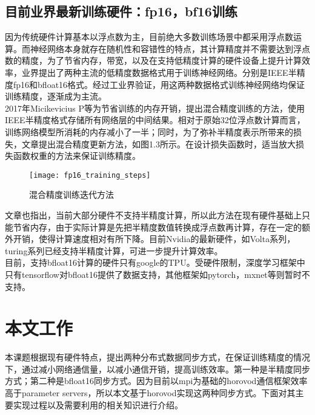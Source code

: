 \subsection{目前业界最新训练硬件：fp16，bf16训练}
因为传统硬件计算基本以浮点数为主，目前绝大多数训练场景中都采用浮点数运算。而神经网络本身就存在随机性和容错性的特点，其计算精度并不需要达到浮点数的精度，为了节省内存，带宽，以及在支持低精度计算的硬件设备上提升计算效率，业界提出了两种主流的低精度数据格式用于训练神经网络。分别是IEEE半精度fp16和bfloat16格式。经过工业界验证，用这两种数据格式训练神经网络均保证训练精度，逐渐成为主流。\\
2017年Micikevicius P等为节省训练的内存开销，提出混合精度训练的方法，使用IEEE半精度格式存储所有网络层的中间结果。相对于原始32位浮点数计算而言，训练网络模型所消耗的内存减小了一半；同时，为了弥补半精度表示所带来的损失，文章提出混合精度更新方法，如图1.3所示。在设计损失函数时，适当放大损失函数权重的方法来保证训练精度。\\
\begin{figure}[htp]
\centering
\texttt{[image: fp16\_training\_steps]}
\caption{混合精度训练迭代方法}
\end{figure}
文章也指出，当前大部分硬件不支持半精度计算，所以此方法在现有硬件基础上只能节省内存，由于实际计算是先把半精度数值转换成浮点数再计算，存在一定的额外开销，使得计算速度相对有所下降。目前Nvidia的最新硬件，如Volta系列，turing系列已经支持半精度计算，可进一步提升计算效率。\\
目前，支持bfloat16计算的硬件只有google的TPU。受硬件限制，深度学习框架中只有tensorflow对bfloat16提供了数据支持，其他框架如pytorch，mxnet等则暂时不支持。

\section{本文工作}
本课题根据现有硬件特点，提出两种分布式数据同步方式，在保证训练精度的情况下，通过减小网络通信量，以减小通信开销，提高训练效率。第一种是半精度同步方式；第二种是bfloat16同步方式。因为目前以mpi为基础的horovod通信框架效率高于parameter servers，所以本文基于horovod实现这两种同步方式。下面对其主要实现过程以及需要利用的相关知识进行介绍。
